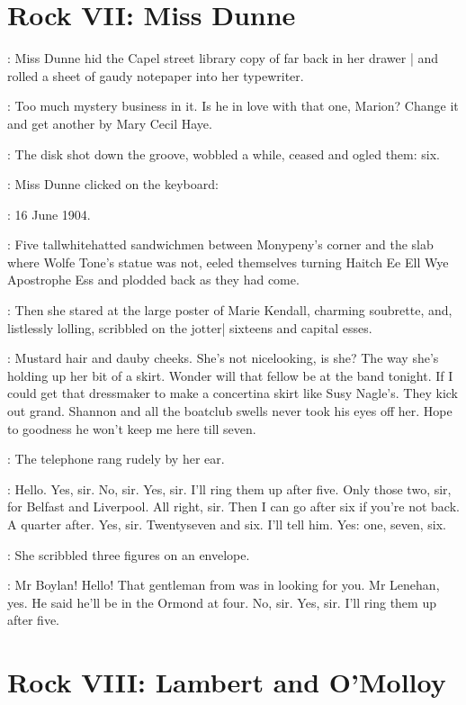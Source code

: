 \section*{Rock VII: Miss Dunne}


:
Miss Dunne hid the Capel street library copy
of  far back in her drawer |
and rolled a sheet of gaudy notepaper into her typewriter.%

\dunneint:
Too much mystery business in it.
Is he in love with that one, Marion?
Change it and get another by Mary Cecil Haye.

:
The disk shot down the groove,
wobbled a while,
ceased and ogled them: six.

:
Miss Dunne clicked on the keyboard:

\missdunne:
16 June 1904.

:
Five tallwhitehatted sandwichmen
between Monypeny's corner and the slab where Wolfe Tone's statue was not,
eeled themselves turning
Haitch Ee Ell Wye Apostrophe Ess \stage{[H.E.L.Y.'S]}
and plodded back as they had come.

:
Then she stared at the large poster of Marie Kendall,
charming soubrette,
and,
listlessly lolling,
scribbled on the jotter|
sixteens and capital esses.

\dunneint:
Mustard hair and dauby cheeks.
She's not nicelooking, is she?
The way she's holding up her bit of a skirt.
Wonder will that fellow be at the band tonight.
If I could get that dressmaker
to make a concertina skirt like Susy Nagle's.
They kick out grand.
Shannon and all the boatclub swells never took his eyes off her.
Hope to goodness
he won't keep me here till seven.

:
The telephone rang rudely by her ear.

\missdunne:
Hello.
Yes, sir.
No, sir.
Yes, sir.
I'll ring them up after five.
Only those two, sir, for Belfast and Liverpool.
All right, sir.
Then I can go after six if you're not back.
A quarter after.
Yes, sir.
Twentyseven and six.
I'll tell him.
Yes: one, seven, six.

:
She scribbled three figures on an envelope.

\missdunne:
Mr Boylan!
Hello!
That gentleman from  was in looking for you.
Mr Lenehan, yes.
He said he'll be in the Ormond at four.
No, sir.
Yes, sir.
I'll ring them up after five.


\section*{Rock VIII: Lambert and O'Molloy}


